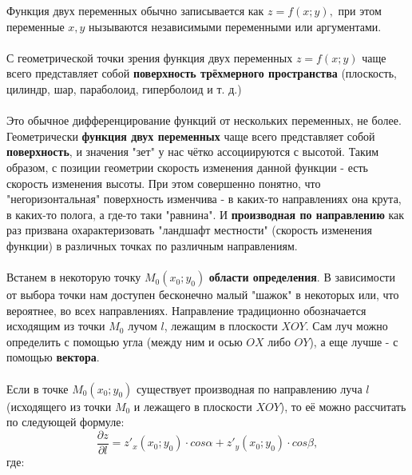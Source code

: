 \documentclass[14pt, letterpaper]{article}
\begin{document}
Функция двух переменных обычно записывается как $z = f(x; y),$ при этом переменные $x, y$ нызываются независимыми переменными или аргументами.

\paragraph{}
С геометрической точки зрения функция двух переменных $z = f(x; y)$ чаще всего представляет собой \textbf{поверхность трёхмерного пространства} (плоскость, цилиндр, шар, параболоид, гиперболоид и т. д.)

\paragraph{}
Это обычное дифференцирование функций от нескольких переменных, не более. Геометрически \textbf{функция двух переменных} чаще всего представляет собой \textbf{поверхность}, и значения "зет" у нас чётко ассоциируются с высотой. Таким образом, с позиции геометрии скорость изменения данной функции  - есть скорость изменения высоты. При этом совершенно понятно, что "негоризонтальная" поверхность изменчива - в каких-то направлениях она крута, в каких-то полога, а где-то таки "равнина". И \textbf{производная по направлению} как раз призвана охарактеризовать "ландшафт местности" (скорость изменения функции) в различных точках по различным направлениям.


\paragraph{}
Встанем в некоторую точку $M_{0}(x_{0}; y_{0})$ \textbf{области определения}. В зависимости от выбора точки нам доступен бесконечно малый "шажок" в некоторых или, что вероятнее, во всех направлениях. Направление традиционно обозначается исходящим из точки $M_{0}$ лучом $l$, лежащим в плоскости $XOY$. Сам луч можно определить с помощью угла (между ним и осью $OX$ либо $OY$), а еще лучше - с помощью \textbf{вектора}.

\paragraph{}
Если в точке $M_{0}(x_{0}; y_{0})$ существует производная по направлению луча $l$ (исходящего из точки $M_{0}$ и лежащего в плоскости $XOY$), то её можно рассчитать по следующей формуле:
$$\frac{\partial z}{\partial l} = z\prime_{x}(x_{0}; y_{0}) \cdot cos\alpha + z\prime_{y}(x_{0}; y_{0}) \cdot cos\beta, $$
где:
\end{document}
